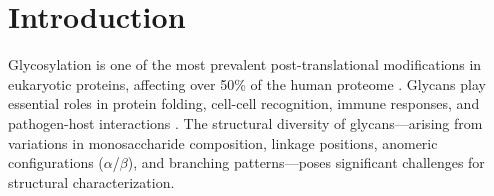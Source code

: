\documentclass[11pt,a4paper]{article}
\begin{document}
\section{Introduction}

Glycosylation is one of the most prevalent post-translational modifications in eukaryotic proteins, affecting over 50\% of the human proteome \citep{varki2017}. Glycans play essential roles in protein folding, cell-cell recognition, immune responses, and pathogen-host interactions \citep{helenius2004}. The structural diversity of glycans---arising from variations in monosaccharide composition, linkage positions, anomeric configurations ($\alpha$/$\beta$), and branching patterns---poses significant challenges for structural characterization.
\end{document}
